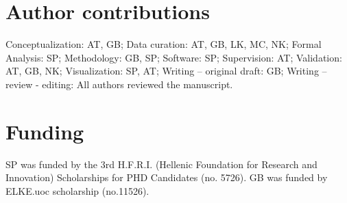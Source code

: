 \section*{Author contributions}
Conceptualization: AT, GB;
Data curation: AT, GB, LK, MC, NK;
Formal Analysis: SP; Methodology: GB, SP; Software: SP; Supervision: AT;
Validation: AT, GB, NK; Visualization: SP, AT; Writing – original draft: GB;
Writing – review - editing: All authors reviewed the manuscript.

\section*{Funding}

SP was funded by the 3rd H.F.R.I.
(Hellenic Foundation for Research and Innovation) Scholarships for
PHD Candidates (no. 5726). GB was funded by ELKE.uoc scholarship (no.11526).

